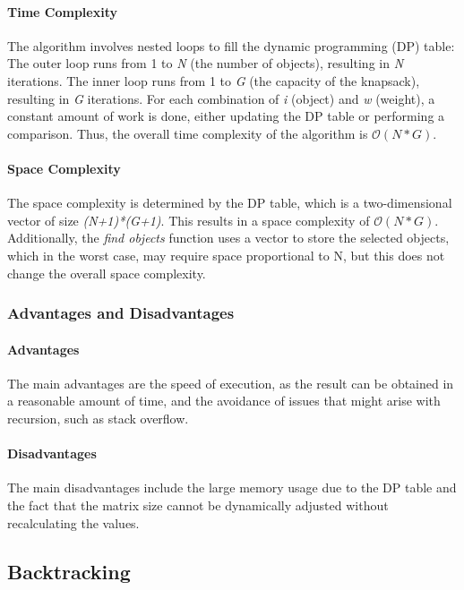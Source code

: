 \documentclass[runningheads]{llncs}
\begin{document}
\paragraph{Time Complexity}
The algorithm involves nested loops to fill the dynamic programming (DP) table:
The outer loop runs from 1 to \textit{N} (the number of objects), resulting in \textit{N} iterations.
The inner loop runs from 1 to \textit{G} (the capacity of the knapsack), resulting in \textit{G} 
iterations. For each combination of \textit{i} (object) and \textit{w} (weight), a constant amount
of work is done, either updating the DP table or performing a comparison. Thus, the overall time
complexity of the algorithm is $\mathcal{O}(N*G)$.

\paragraph{Space Complexity}
The space complexity is determined by the DP table, which is a two-dimensional vector of size 
\textit{(N+1)*(G+1)}. This results in a space complexity of $\mathcal{O}(N*G)$.
Additionally, the \textit{find objects} function uses a vector to store the selected objects, which 
in the worst case, may require space proportional to N, but this does not change the overall space 
complexity.

\subsubsection{Advantages and Disadvantages}
\paragraph{Advantages}
The main advantages are the speed of execution, as the result can be obtained in a reasonable amount
of time, and the avoidance of issues that might arise with recursion, such as stack overflow.

\paragraph{Disadvantages}
The main disadvantages include the large memory usage due to the DP table and the fact that the 
matrix size cannot be dynamically adjusted without recalculating the values.

\subsection{Backtracking}
\end{document}
